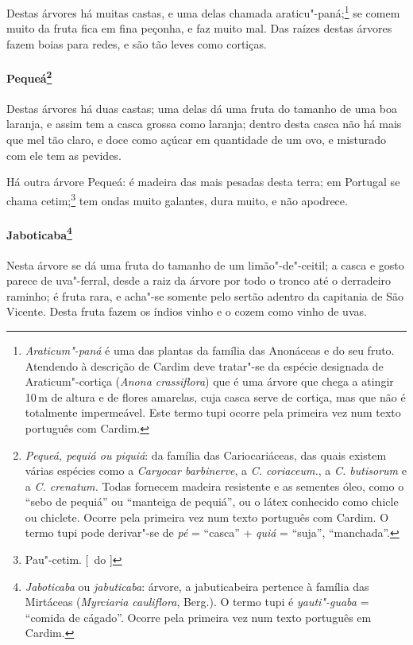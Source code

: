  Destas árvores há muitas castas, e uma delas chamada 
araticu"-paná;\footnote{ \textit{Araticum"-paná} é uma das plantas da família das
Anonáceas e do seu fruto. Atendendo à descrição de Cardim deve
tratar"-se da espécie designada de Araticum"-cortiça (\textit{Anona
crassiflora}) que é uma árvore que chega a atingir 10\,m de altura e de
flores amarelas, cuja casca serve de cortiça, mas que não é totalmente
impermeável. Este termo tupi ocorre pela primeira vez num texto
português com Cardim.} se comem muito da fruta fica em fina peçonha, e
faz muito mal. Das raízes destas árvores fazem boias para redes, e são
tão leves como cortiças.

\paragraph{Pequeá\footnote{ \textit{Pequeá, pequiá ou piquiá}: da
família das Cariocariáceas, das quais existem várias espécies como a 
\textit{Caryocar barbinerve}, a \textit{C. coriaceum.}, a \textit{C.
butisorum} e a \textit{C. crenatum.} Todas fornecem madeira resistente
e as sementes óleo, como o ``sebo de pequiá'' ou ``manteiga de pequiá'', ou
o látex conhecido como chicle ou chiclete. Ocorre pela primeira vez num
texto português com Cardim. O termo tupi pode derivar"-se de \textit{pé} = 
``casca'' + \textit{quiá} = ``suja'', ``manchada''.}} Destas
árvores há duas castas; uma delas dá uma fruta do tamanho de uma boa
laranja, e assim tem a casca grossa como laranja; dentro desta casca
não há mais que mel tão claro, e doce como açúcar em quantidade de um
ovo, e misturado com ele tem as pevides.

 Há outra árvore Pequeá: é madeira das mais pesadas desta terra; em
Portugal se chama cetim;\footnote{ Pau"-cetim. [~do ]} tem ondas muito galantes, dura muito, e não
apodrece.

\paragraph{Jaboticaba\footnote{ \textit{Jaboticaba} ou
\textit{jabuticaba}: árvore, a jabuticabeira pertence à família das
Mirtáceas (\textit{Myrciaria cauliflora}, Berg.). O termo tupi é
\textit{yauti"-guaba} = ``comida de cágado''. Ocorre pela primeira vez num
texto português em Cardim.}} Nesta árvore se dá uma fruta do
tamanho de um limão"-de"-ceitil; a casca e gosto parece de uva"-ferral,
desde a raiz da árvore por todo o tronco até o derradeiro raminho; é
fruta rara, e acha"-se somente pelo sertão adentro da capitania de São
Vicente. Desta fruta fazem os índios vinho e o cozem como vinho de uvas.

